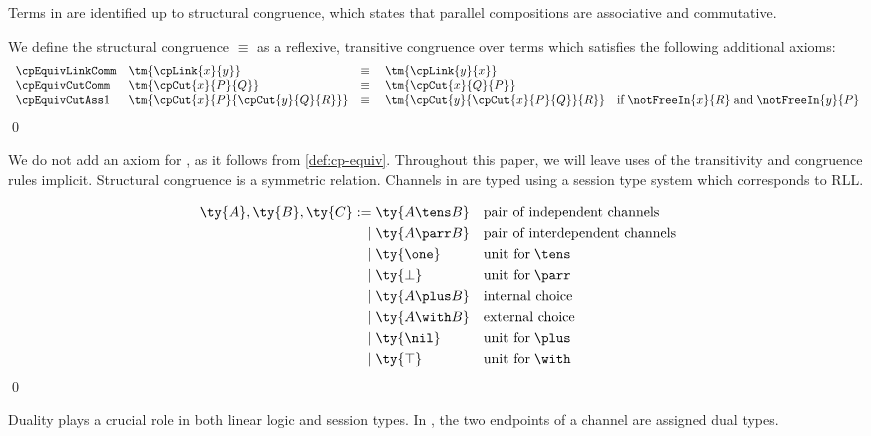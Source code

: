 \documentclass[UKenglish]{llncs}
\begin{document}
Terms in \cp are identified up to structural congruence, which states that
parallel compositions  are associative and commutative.
\begin{definition}\label{def:cp-equiv}
  We define the structural congruence $\equiv$ as a reflexive, transitive
  congruence over terms which satisfies the following additional axioms:
  \[
    \begin{array}{llll}
      \cpEquivLinkComm
      & \tm{\cpLink{x}{y}}
      & \equiv \;
      & \tm{\cpLink{y}{x}}
      \\
      \cpEquivCutComm
      & \tm{\cpCut{x}{P}{Q}}
      & \equiv \;
      & \tm{\cpCut{x}{Q}{P}}
      \\
      \cpEquivCutAss1
      & \tm{\cpCut{x}{P}{\cpCut{y}{Q}{R}}}
      & \equiv \;
      & \tm{\cpCut{y}{\cpCut{x}{P}{Q}}{R}}
        \quad \text{if} \; \notFreeIn{x}{R} \; \text{and} \; \notFreeIn{y}{P}
    \end{array}
  \]
  \qed
\end{definition}
We do not add an axiom for , as it follows from
\cref{def:cp-equiv}.
Throughout this paper, we will leave uses of the transitivity and
congruence rules implicit.
Structural congruence is a symmetric relation.
%
Channels in \cp are typed using a session type system which corresponds to RLL.
\begin{definition}[Types]\label{def:cp-types}
  \[\!
    \begin{aligned}
      \ty{A}, \ty{B}, \ty{C}
           :=& \; \ty{A \tens B} &&\text{pair of independent channels}
      \\ \mid& \; \ty{A \parr B} &&\text{pair of interdependent channels}
      \\ \mid& \; \ty{\one}      &&\text{unit for} \; {\tens}
      \\ \mid& \; \ty{\bot}      &&\text{unit for} \; {\parr}
      \\ \mid& \; \ty{A \plus B} &&\text{internal choice}
      \\ \mid& \; \ty{A \with B} &&\text{external choice}
      \\ \mid& \; \ty{\nil}      &&\text{unit for} \; {\plus}
      \\ \mid& \; \ty{\top}      &&\text{unit for} \; {\with}
    \end{aligned}
  \]  
  \qed
\end{definition}
Duality plays a crucial role in both linear logic and session types.
In \cp, the two endpoints of a channel are assigned dual types.
\end{document}
